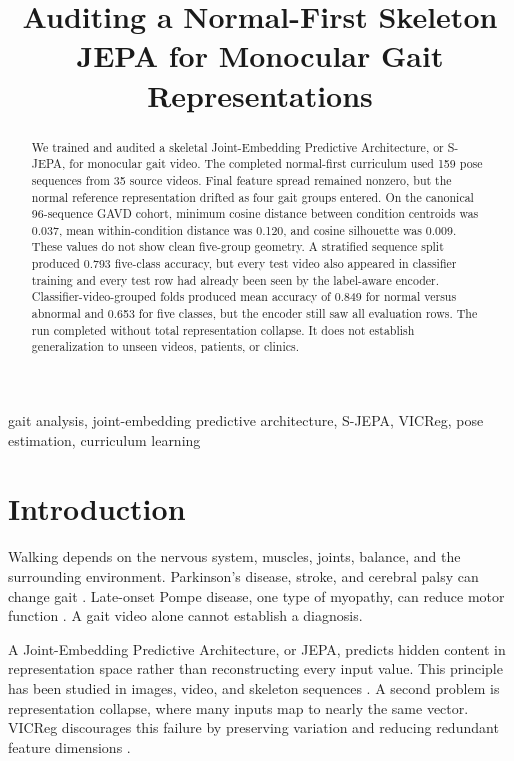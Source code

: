 \documentclass[conference]{IEEEtran}
\title{Auditing a Normal-First Skeleton JEPA for Monocular Gait Representations}
\author{
\IEEEauthorblockN{Theodore Mui, Alex Mui, Penny Inouye, and Phil Mui}
\IEEEauthorblockA{\textit{Aspiring Scholars Directed Research Program (ASDRP)}\\
\texttt{tedmui@stanford.edu} \quad \texttt{alexander.mui@students.asdrp.org}\\
\texttt{pennypenelopesf@gmail.com} \quad \texttt{phil.mui@asdrp.org}}
}
\begin{document}
\maketitle

\begin{abstract}
We trained and audited a skeletal Joint-Embedding Predictive Architecture, or S-JEPA, for monocular gait video. The completed normal-first curriculum used 159 pose sequences from 35 source videos. Final feature spread remained nonzero, but the normal reference representation drifted as four gait groups entered. On the canonical 96-sequence GAVD cohort, minimum cosine distance between condition centroids was 0.037, mean within-condition distance was 0.120, and cosine silhouette was 0.009. These values do not show clean five-group geometry. A stratified sequence split produced 0.793 five-class accuracy, but every test video also appeared in classifier training and every test row had already been seen by the label-aware encoder. Classifier-video-grouped folds produced mean accuracy of 0.849 for normal versus abnormal and 0.653 for five classes, but the encoder still saw all evaluation rows. The run completed without total representation collapse. It does not establish generalization to unseen videos, patients, or clinics.
\end{abstract}

\begin{IEEEkeywords}
gait analysis, joint-embedding predictive architecture, S-JEPA, VICReg, pose estimation, curriculum learning
\end{IEEEkeywords}

\section{Introduction}
Walking depends on the nervous system, muscles, joints, balance, and the surrounding environment. Parkinson's disease, stroke, and cerebral palsy can change gait \cite{zanardi2021parkinsons,lauziere2014stroke,pandey2023crouch}. Late-onset Pompe disease, one type of myopathy, can reduce motor function \cite{maulet2023myopathy}. A gait video alone cannot establish a diagnosis.

A Joint-Embedding Predictive Architecture, or JEPA, predicts hidden content in representation space rather than reconstructing every input value. This principle has been studied in images, video, and skeleton sequences \cite{assran2023ijepa,bardes2024vjepa,abdelfattah2024sjepa}. A second problem is representation collapse, where many inputs map to nearly the same vector. VICReg discourages this failure by preserving variation and reducing redundant feature dimensions \cite{bardes2022vicreg}.
\end{document}
